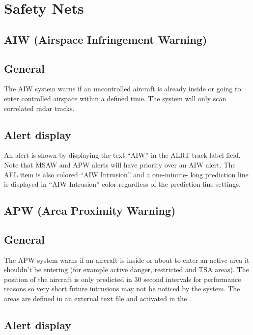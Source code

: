 \documentclass[11pt,a4paper]{memoir}
\begin{document}
\section{Safety Nets}

\subsection{AIW (Airspace Infringement Warning)}

\subsection*{General}

The AIW system warns if an uncontrolled aircraft is already inside or going to enter controlled airspace within a defined time. The system will only scan correlated radar tracks.

\subsection*{Alert display}

An alert is shown by displaying the text “AIW” in the ALRT track label field. Note that MSAW and APW alerts will have priority over an AIW alert. The AFL item is also colored “AIW Intrusion” and a one-minute- long prediction line is displayed in “AIW Intrusion” color regardless of the prediction line settings.


\subsection{APW (Area Proximity Warning)}

\subsection*{General}

The APW system warns if an aircraft is inside or about to enter an active area it shouldn’t be entering (for example active danger, restricted and TSA areas). The position of the aircraft is only predicted in 30 second intervals for performance reasons so very short future intrusions may not be noticed by the system. The areas are defined in an external text file and activated in the \textit{}.

\subsection*{Alert display}
\end{document}
